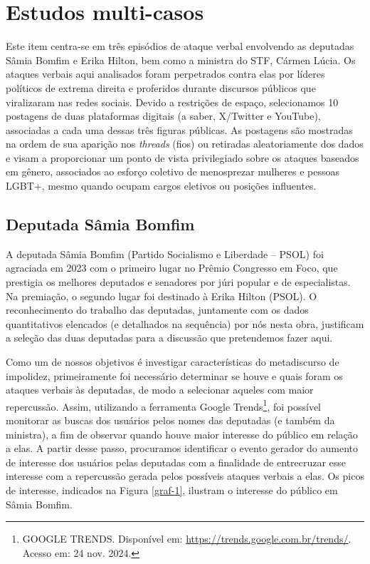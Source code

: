 \documentclass[portuguese]{textolivre}
\begin{document}
\section{Estudos multi-casos}\label{sec-3}
Este item centra-se em três episódios de ataque verbal envolvendo as deputadas Sâmia Bomfim e Erika Hilton, bem como a ministra do STF, Cármen Lúcia. Os ataques verbais aqui analisados foram perpetrados contra elas por líderes políticos de extrema direita e proferidos durante discursos públicos que viralizaram nas redes sociais. Devido a restrições de espaço, selecionamos 10 postagens de duas plataformas digitais (a saber, X/Twitter e YouTube), associadas a cada uma dessas três figuras públicas. As postagens são mostradas na ordem de sua aparição nos \textit{threads} (fios) ou retiradas aleatoriamente dos dados e visam a proporcionar um ponto de vista privilegiado sobre os ataques baseados em gênero, associados ao esforço coletivo de menosprezar mulheres e pessoas LGBT+, mesmo quando ocupam cargos eletivos ou posições influentes.

\subsection{Deputada Sâmia Bomfim}\label{sec-3.1}
A deputada Sâmia Bomfim (Partido Socialismo e Liberdade -- PSOL) foi agraciada em 2023 com o primeiro lugar no Prêmio Congresso em Foco, que prestigia os melhores deputados e senadores por júri popular e de especialistas. Na premiação, o segundo lugar foi destinado à Erika Hilton (PSOL). O reconhecimento do trabalho das deputadas, juntamente com os dados quantitativos elencados (e detalhados na sequência) por nós nesta obra, justificam a seleção das duas deputadas para a discussão que pretendemos fazer aqui.

Como um de nossos objetivos é investigar características do metadiscurso de impolidez, primeiramente foi necessário determinar se houve e quais foram os ataques verbais às deputadas, de modo a selecionar aqueles com maior repercussão. Assim, utilizando a ferramenta Google Trends\footnote{GOOGLE TRENDS. Disponível em: \url{https://trends.google.com.br/trends/}. Acesso em: 24 nov. 2024.}, foi possível monitorar as buscas dos usuários pelos nomes das deputadas (e também da ministra), a fim de observar quando houve maior interesse do público em relação a elas. A partir desse passo, procuramos identificar o evento gerador do aumento de interesse dos usuários pelas deputadas com a finalidade de entrecruzar esse interesse com a repercussão gerada pelos possíveis ataques verbais a elas. Os picos de interesse, indicados na Figura \ref{graf-1}, ilustram o interesse do público em Sâmia Bomfim.
\end{document}
